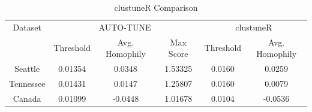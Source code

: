 \documentclass[utf8]{FrontiersinHarvard} %
\begin{document}
\begin{table}[h]
	\caption{clustuneR Comparison}
	\vspace{8pt}
	\centering
	\label{tab:homophily}
	\begin{tabular}{|c|c|c|c|c|c|}
		\hline
		Dataset   & \multicolumn{3}{c|}{AUTO-TUNE} & \multicolumn{2}{c|}{clustuneR}                                          \\
		\cline{2-6}
		          & Threshold                      & Avg. Homophily                 & Max Score & Threshold & Avg. Homophily \\
		\hline
		Seattle   & 0.01354                        & 0.0348                         & 1.53325   & 0.0160    & 0.0259         \\
		Tennessee & 0.01431                        & 0.0147                         & 1.25807   & 0.0160    & 0.0079         \\
		Canada    & 0.01099                        & -0.0448                        & 1.01678   & 0.0104    & -0.0536        \\
		\hline
	\end{tabular}
\end{table}
\end{document}
